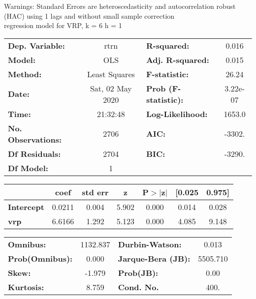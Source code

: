 Warnings: \newline
 [1] Standard Errors are heteroscedasticity and autocorrelation robust (HAC) using 1 lags and without small sample correction\\ 

regression model for VRP, k = 6 h = 1\begin{center}
\begin{tabular}{lclc}
\toprule
\textbf{Dep. Variable:}    &       rtrn       & \textbf{  R-squared:         } &     0.016   \\
\textbf{Model:}            &       OLS        & \textbf{  Adj. R-squared:    } &     0.015   \\
\textbf{Method:}           &  Least Squares   & \textbf{  F-statistic:       } &     26.24   \\
\textbf{Date:}             & Sat, 02 May 2020 & \textbf{  Prob (F-statistic):} &  3.22e-07   \\
\textbf{Time:}             &     21:32:48     & \textbf{  Log-Likelihood:    } &    1653.0   \\
\textbf{No. Observations:} &        2706      & \textbf{  AIC:               } &    -3302.   \\
\textbf{Df Residuals:}     &        2704      & \textbf{  BIC:               } &    -3290.   \\
\textbf{Df Model:}         &           1      & \textbf{                     } &             \\
\bottomrule
\end{tabular}
\begin{tabular}{lcccccc}
                   & \textbf{coef} & \textbf{std err} & \textbf{z} & \textbf{P$> |$z$|$} & \textbf{[0.025} & \textbf{0.975]}  \\
\midrule
\textbf{Intercept} &       0.0211  &        0.004     &     5.902  &         0.000        &        0.014    &        0.028     \\
\textbf{vrp}       &       6.6166  &        1.292     &     5.123  &         0.000        &        4.085    &        9.148     \\
\bottomrule
\end{tabular}
\begin{tabular}{lclc}
\textbf{Omnibus:}       & 1132.837 & \textbf{  Durbin-Watson:     } &    0.013  \\
\textbf{Prob(Omnibus):} &   0.000  & \textbf{  Jarque-Bera (JB):  } & 5505.710  \\
\textbf{Skew:}          &  -1.979  & \textbf{  Prob(JB):          } &     0.00  \\
\textbf{Kurtosis:}      &   8.759  & \textbf{  Cond. No.          } &     400.  \\
\bottomrule
\end{tabular}
\end{center}

